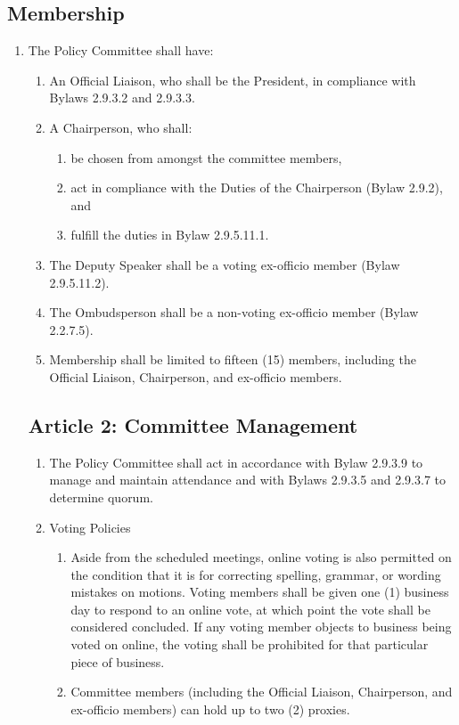 \subsection{Membership}
\begin{enumerate}[label*=\arabic*., align=left]	
\item The Policy Committee shall have:
\begin{enumerate}[label*=\arabic*., align=left]	
\item An Official Liaison, who shall be the President, in compliance with Bylaws 2.9.3.2 and
2.9.3.3.
\item A Chairperson, who shall:
\begin{enumerate}
\item be chosen from amongst the committee members,
\item act in compliance with the Duties of the Chairperson (Bylaw 2.9.2), and
\item fulfill the duties in Bylaw 2.9.5.11.1.
\end{enumerate}
\item The Deputy Speaker shall be a voting ex-officio member (Bylaw 2.9.5.11.2).
\item The Ombudsperson shall be a non-voting ex-officio member (Bylaw 2.2.7.5).
\item Membership shall be limited to fifteen (15) members, including the Official Liaison,
Chairperson, and ex-officio members.
\end{enumerate}

\subsection{Article 2: Committee Management}
\begin{enumerate}[label*=\arabic*., align=left]	
\item The Policy Committee shall act in accordance with Bylaw 2.9.3.9 to manage and maintain
attendance and with Bylaws 2.9.3.5 and 2.9.3.7 to determine quorum.
\item Voting Policies
\begin{enumerate}[label*=\arabic*., align=left]	
\item Aside from the scheduled meetings, online voting is also permitted on the condition that it is for correcting spelling, grammar, or wording mistakes on motions. Voting members shall be given one (1) business day to respond to an online vote, at which point the vote shall be considered concluded. If any voting member objects to business being voted on online, the voting shall be prohibited for that particular piece of business.
\item Committee members (including the Official Liaison, Chairperson, and ex-officio members) can hold up to two (2) proxies.
\end{enumerate}
\end{enumerate}
\end{enumerate}

